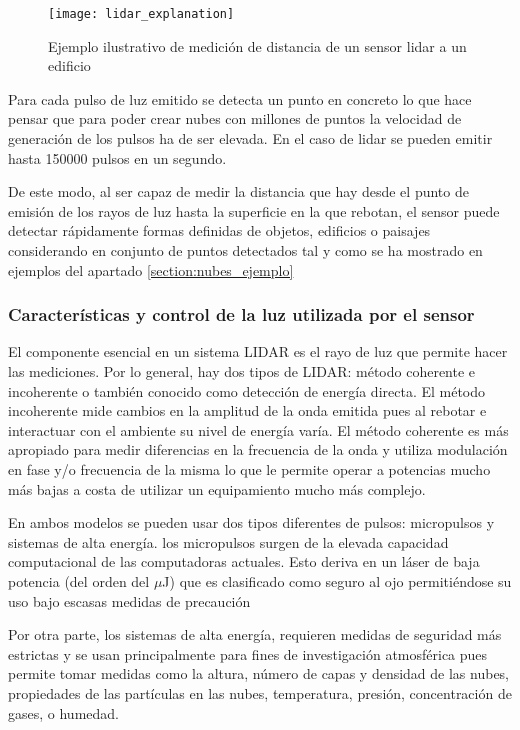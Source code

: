 \begin{figure}
\centering
{}
  \texttt{[image: lidar\_explanation]}
  \caption{Ejemplo ilustrativo de medición de distancia de un sensor lidar a un edificio}\label{fig:lidar explanation}
\endminipage\hfill

\end{figure}

Para cada pulso de luz emitido se detecta un punto en concreto lo que hace pensar que para poder crear nubes con millones de puntos la velocidad de generación de los pulsos ha de ser elevada. En el caso de lidar se pueden emitir hasta 150000 pulsos en un segundo.

De este modo, al ser capaz de medir la distancia que hay desde el punto de emisión de los rayos de luz hasta la superficie en la que rebotan, el sensor puede detectar rápidamente formas definidas de objetos, edificios o paisajes considerando en conjunto de puntos detectados tal y como se ha mostrado en ejemplos del apartado \ref{section:nubes_ejemplo}

\subsubsection{Características y control de la luz utilizada por el sensor}
El componente esencial en un sistema LIDAR es el rayo de luz que permite hacer las mediciones. Por lo general, hay dos tipos de LIDAR:
método coherente e incoherente o también conocido como detección de energía directa.
El método incoherente mide cambios en la amplitud de la onda emitida pues al rebotar e interactuar con el ambiente su nivel de energía varía.
El método coherente es más apropiado para medir diferencias en la frecuencia de la onda y utiliza modulación en fase y/o frecuencia de la misma lo que le permite operar a potencias mucho más bajas a costa de utilizar un equipamiento mucho más complejo.


En ambos modelos se pueden usar dos tipos diferentes de pulsos: micropulsos y sistemas de alta energía.
los micropulsos surgen de la elevada capacidad computacional de las computadoras actuales. Esto deriva en un láser de baja potencia (del orden del $\mu$J) que es clasificado como seguro al ojo permitiéndose su uso bajo escasas medidas de precaución 

Por otra parte, los sistemas de alta energía, requieren medidas de seguridad más estrictas y se usan principalmente para fines de investigación atmosférica pues permite tomar medidas como la altura, número de capas y densidad de las nubes, propiedades de las partículas en las nubes, temperatura, presión, concentración de gases, o humedad.

